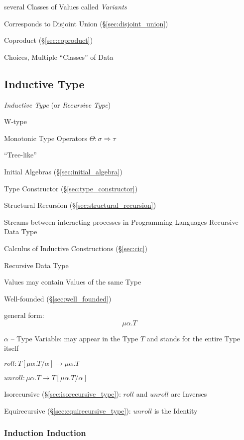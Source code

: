 several Classes of Values called \emph{Variants}

Corresponds to Disjoint Union (\S\ref{sec:disjoint_union})

Coproduct (\S\ref{sec:coproduct})

Choices, Multiple ``Classes'' of Data



\subsection{Inductive Type}\label{sec:inductive_type}

\emph{Inductive Type} (or \emph{Recursive Type})

W-type

Monotonic Type Operators $\Theta : \sigma \Rightarrow \tau$

``Tree-like''

Initial Algebras (\S\ref{sec:initial_algebra})

Type Constructor (\S\ref{sec:type_constructor})

Structural Recursion (\S\ref{sec:structural_recursion})

Streams between interacting processes in Programming Languages
Recursive Data Type

Calculus of Inductive Constructions (\S\ref{sec:cic})


\asterism


Recursive Data Type

Values may contain Values of the same Type

Well-founded (\S\ref{sec:well_founded})

general form:
\[
  \mu\alpha.T
\]

$\alpha$ -- Type Variable: may appear in the Type $T$ and stands for
the entire Type itself

$roll : T[\mu\alpha.T/\alpha] \rightarrow \mu\alpha.T$

$unroll : \mu\alpha.T \rightarrow T[\mu\alpha.T/\alpha]$

Isorecursive (\S\ref{sec:isorecursive_type}): $roll$ and $unroll$
are Inverses

Equirecursive (\S\ref{sec:equirecursive_type}): $unroll$ is the
Identity



\subsubsection{Induction Induction}\label{sec:induction_induction}

